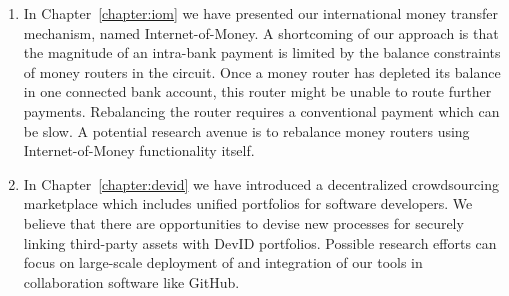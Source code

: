 \begin{enumerate}
	\item In Chapter~\ref{chapter:iom} we have presented our international money transfer mechanism, named Internet-of-Money.
	A shortcoming of our approach is that the magnitude of an intra-bank payment is limited by the balance constraints of money routers in the circuit.
	Once a money router has depleted its balance in one connected bank account, this router might be unable to route further payments.
	Rebalancing the router requires a conventional payment which can be slow.
	A potential research avenue is to rebalance money routers using Internet-of-Money functionality itself.
	
	\item In Chapter~\ref{chapter:devid} we have introduced a decentralized crowdsourcing marketplace which includes unified portfolios for software developers.
	We believe that there are opportunities to devise new processes for securely linking third-party assets with DevID portfolios.
	Possible research efforts can focus on large-scale deployment of \Dappcoder{} and integration of our tools in collaboration software like GitHub.
\end{enumerate}